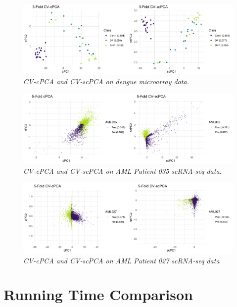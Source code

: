 \documentclass{article}
\begin{document}
\begin{figure}
    \centering
    \includegraphics[width = \textwidth]{figures/dengue_cv_results.png}
    \caption{\em{CV-cPCA and CV-scPCA on dengue microarray data.}}
    \label{fig:cv_dengue}
\end{figure}

\begin{figure}
    \centering
    \includegraphics[width = \textwidth]{figures/aml035_cv_results.png}
    \caption{\em{CV-cPCA and CV-scPCA on AML Patient 035 scRNA-seq data.}}
    \label{fig:cv_aml035}
\end{figure}

\begin{figure}
    \centering
    \includegraphics[width = \textwidth]{figures/aml027_cv_results.png}
    \caption{\em{CV-cPCA and CV-scPCA on AML Patient 027 scRNA-seq data}}
    \label{fig:cv_aml027}
\end{figure}
 
 
\section{Running Time Comparison}\label{run_time}
\end{document}
